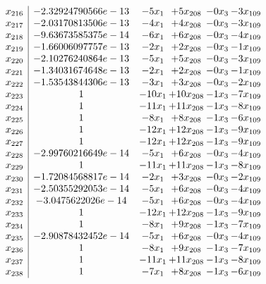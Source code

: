 \documentclass[11pt]{article}
\begin{document}
\[\begin{array}{c| c c@{\hskip 2pt} c@{\hskip 2pt} c@{\hskip 2pt} c@{\hskip 2pt} }
 x_{216}   &  -2.32924790566e-13 & -5 x_{1} & + 5 x_{208} & -0 x_{3} & -3 x_{109}\\
 x_{217}   &  -2.03170813506e-13 & -4 x_{1} & + 4 x_{208} & -0 x_{3} & -3 x_{109}\\
 x_{218}   &  -9.63673585375e-14 & -6 x_{1} & + 6 x_{208} & -0 x_{3} & -4 x_{109}\\
 x_{219}   &  -1.66006097757e-13 & -2 x_{1} & + 2 x_{208} & -0 x_{3} & -1 x_{109}\\
 x_{220}   &  -2.10276240864e-13 & -5 x_{1} & + 5 x_{208} & -0 x_{3} & -3 x_{109}\\
 x_{221}   &  -1.34031674648e-13 & -2 x_{1} & + 2 x_{208} & -0 x_{3} & -1 x_{109}\\
 x_{222}   &  -1.53543844306e-13 & -3 x_{1} & + 3 x_{208} & -0 x_{3} & -2 x_{109}\\
 x_{223}   &  1 & -10 x_{1} & + 10 x_{208} & -1 x_{3} & -7 x_{109}\\
 x_{224}   &  1 & -11 x_{1} & + 11 x_{208} & -1 x_{3} & -8 x_{109}\\
 x_{225}   &  1 & -8 x_{1} & + 8 x_{208} & -1 x_{3} & -6 x_{109}\\
 x_{226}   &  1 & -12 x_{1} & + 12 x_{208} & -1 x_{3} & -9 x_{109}\\
 x_{227}   &  1 & -12 x_{1} & + 12 x_{208} & -1 x_{3} & -9 x_{109}\\
 x_{228}   &  -2.99760216649e-14 & -5 x_{1} & + 6 x_{208} & -0 x_{3} & -4 x_{109}\\
 x_{229}   &  1 & -11 x_{1} & + 11 x_{208} & -1 x_{3} & -8 x_{109}\\
 x_{230}   &  -1.72084568817e-14 & -2 x_{1} & + 3 x_{208} & -0 x_{3} & -2 x_{109}\\
 x_{231}   &  -2.50355292053e-14 & -5 x_{1} & + 6 x_{208} & -0 x_{3} & -4 x_{109}\\
 x_{232}   &  -3.0475622026e-14 & -5 x_{1} & + 6 x_{208} & -0 x_{3} & -4 x_{109}\\
 x_{233}   &  1 & -12 x_{1} & + 12 x_{208} & -1 x_{3} & -9 x_{109}\\
 x_{234}   &  1 & -8 x_{1} & + 9 x_{208} & -1 x_{3} & -7 x_{109}\\
 x_{235}   &  -2.90878432452e-14 & -5 x_{1} & + 6 x_{208} & -0 x_{3} & -4 x_{109}\\
 x_{236}   &  1 & -8 x_{1} & + 9 x_{208} & -1 x_{3} & -7 x_{109}\\
 x_{237}   &  1 & -11 x_{1} & + 11 x_{208} & -1 x_{3} & -8 x_{109}\\
 x_{238}   &  1 & -7 x_{1} & + 8 x_{208} & -1 x_{3} & -6 x_{109}\\

\end{array}\]
\end{document}
